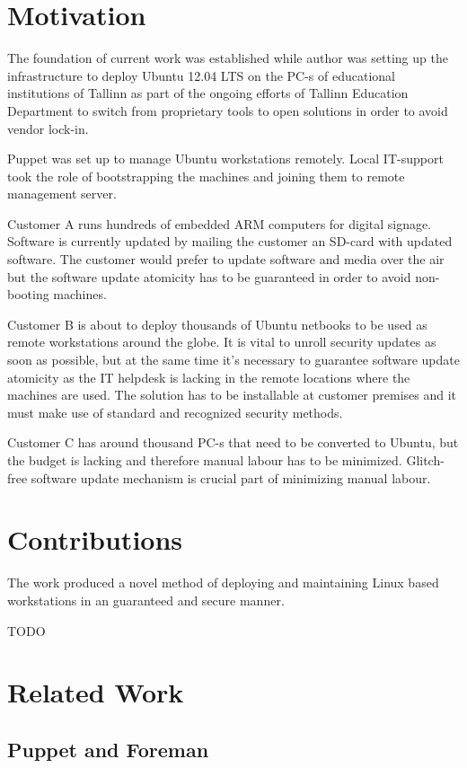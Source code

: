 \documentclass[a4paper,11pt]{kth-mag}
\begin{document}
\section{Motivation}
\label{sec:mot}
The foundation of current work was established while author was setting up
the infrastructure to deploy Ubuntu 12.04 LTS on the PC-s of educational
institutions of Tallinn as part of the ongoing efforts of Tallinn Education
Department to switch from proprietary tools to open solutions
in order to avoid vendor lock-in.

Puppet was set up to manage Ubuntu workstations remotely. Local IT-support
took the role of bootstrapping the machines and joining them to remote
management server.

Customer A runs hundreds of embedded ARM computers for digital signage.
Software is currently updated by mailing the customer an SD-card with
updated software. The customer would prefer to update software and
media over the air but the software update atomicity has to be guaranteed
in order to avoid non-booting machines.

Customer B is about to deploy thousands of Ubuntu netbooks to be used as
remote workstations around the globe. It is vital to unroll security updates
as soon as possible, but at the same time it's necessary to guarantee
software update atomicity as the IT helpdesk is lacking in the remote
locations where the machines are used.
The solution has to be installable at customer premises and it
must make use of standard and recognized security methods.

Customer C has around thousand PC-s that need to be converted to Ubuntu,
but the budget is lacking and therefore manual labour has to be minimized.
Glitch-free software update mechanism is crucial part of minimizing manual
labour.

\section{Contributions}

The work produced a novel method of deploying and maintaining Linux
based workstations in an guaranteed and secure manner.

TODO

\section{Related Work}
\label{sec:related}

\subsection{Puppet and Foreman}
\end{document}
